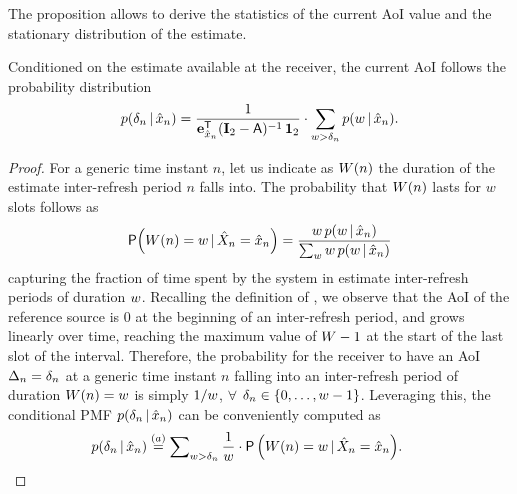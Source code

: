 The proposition allows to derive the statistics of the current AoI value and the stationary distribution of the estimate.
\begin{prop}\label{prop:condXn}
    Conditioned on the estimate available at the receiver, the current AoI follows the probability distribution
    \begin{align}
        p(\delta_n\, | \,\hat{x}_n) = \frac{1}{\mathbf e_{\hat{x}_n}^{\mathsf T} (\mathbf I_2 - \mathsf A)^{-1} \, \mathbf 1_2} \cdot \sum_{w>\delta_n} p(w\, | \, \hat{x}_n).
        \label{eq:condPMFAge_complete}
    \end{align}
    \begin{proof}
        For a generic time instant $n$, let us indicate as $W(n)$ the duration of the estimate inter-refresh period $n$ falls into. The probability that $W(n)$ lasts for $w$ slots follows as
        \begin{align}
        \mathsf P \!\left( W(n)=w \, | \, \hat{X}_n=\hat{x}_n \right) = \frac{w \, p(w\, | \,\hat{x}_n)}{\sum\nolimits_{w} w \, p(w\, | \,\hat{x}_n)}
        \label{eq:condProbW}
        \end{align}
        capturing the fraction of time spent by the system in estimate inter-refresh periods of duration $w$. %
        Recalling the definition of \Irt, we observe that the AoI of the reference source is $0$ at the beginning of an inter-refresh period, and grows linearly over time, reaching the maximum value of $W-1$ at the start of the last slot of the interval. Therefore, the probability for the receiver to have an AoI $\Delta_n=\delta_n$ at a generic time instant $n$ falling into an inter-refresh period of duration $W(n)=w$ is simply $1/w$, $\forall$ $\delta_n\in\{0,\dots,w-1\}$. Leveraging this, the conditional PMF $p(\delta_n\, | \,\hat{x}_n)$ can be conveniently computed as
        \begin{align}
            \begin{split}
            \!\!\!\!\!p(\agen\given\estn) &\stackrel{(a)}{=} \sum\nolimits_{\irt > \agen} \frac{1}{\irt} \cdot \mathsf P\left(\Irt(n) = \irt \given \Estn=\estn\right)\!. %
            \end{split}

\end{align}
\end{proof}
\end{prop}
